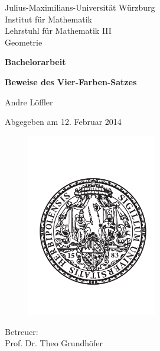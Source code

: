 \begin{titlepage}
  Julius-Maximilians-Universität Würzburg\\
  Institut für Mathematik\\
  Lehrstuhl für Mathematik III\\
  Geometrie
  
  \vspace{2cm}
  
  \begin{center}
   \LARGE\textbf{Bachelorarbeit}
  \end{center}
  
  \vspace{0cm}
  
  \begin{center}
   \huge\textbf{Beweise des Vier-Farben-Satzes}
  \end{center}
  
  \vspace{1cm}
  
  \begin{center}
   \Large Andre Löffler
  \end{center}
  
  \vspace{0cm}
  
  \begin{center}
   \Large Abgegeben am 12. Februar 2014
  \end{center}
  
  \begin{figure}[ht]
    \begin{center}
      \includegraphics[height=8cm]{siegel.pdf}  
    \end{center}
  \end{figure}
  
  \begin{center}
   \Large Betreuer:\\ Prof. Dr. Theo Grundhöfer
  \end{center}
\end{titlepage}